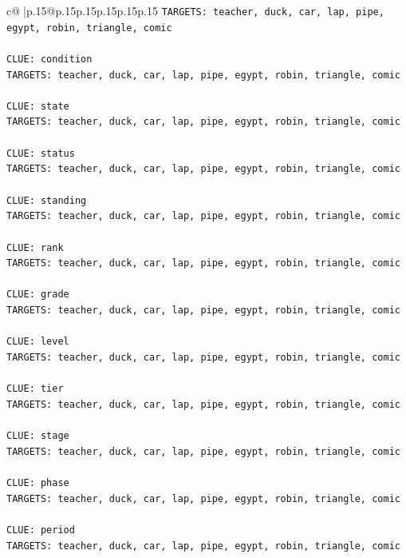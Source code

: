 \documentclass{article}
\begin{document}
{\begin{supertabular}{c@{$\;$}|p{.15\linewidth}@{}p{.15\linewidth}p{.15\linewidth}p{.15\linewidth}p{.15\linewidth}p{.15\linewidth}}
{{{\texttt{TARGETS: teacher, duck, car, lap, pipe, egypt, robin, triangle, comic} \\
\\ 
\texttt{CLUE: condition} \\
\texttt{TARGETS: teacher, duck, car, lap, pipe, egypt, robin, triangle, comic} \\
\\ 
\texttt{CLUE: state} \\
\texttt{TARGETS: teacher, duck, car, lap, pipe, egypt, robin, triangle, comic} \\
\\ 
\texttt{CLUE: status} \\
\texttt{TARGETS: teacher, duck, car, lap, pipe, egypt, robin, triangle, comic} \\
\\ 
\texttt{CLUE: standing} \\
\texttt{TARGETS: teacher, duck, car, lap, pipe, egypt, robin, triangle, comic} \\
\\ 
\texttt{CLUE: rank} \\
\texttt{TARGETS: teacher, duck, car, lap, pipe, egypt, robin, triangle, comic} \\
\\ 
\texttt{CLUE: grade} \\
\texttt{TARGETS: teacher, duck, car, lap, pipe, egypt, robin, triangle, comic} \\
\\ 
\texttt{CLUE: level} \\
\texttt{TARGETS: teacher, duck, car, lap, pipe, egypt, robin, triangle, comic} \\
\\ 
\texttt{CLUE: tier} \\
\texttt{TARGETS: teacher, duck, car, lap, pipe, egypt, robin, triangle, comic} \\
\\ 
\texttt{CLUE: stage} \\
\texttt{TARGETS: teacher, duck, car, lap, pipe, egypt, robin, triangle, comic} \\
\\ 
\texttt{CLUE: phase} \\
\texttt{TARGETS: teacher, duck, car, lap, pipe, egypt, robin, triangle, comic} \\
\\ 
\texttt{CLUE: period} \\
\texttt{TARGETS: teacher, duck, car, lap, pipe, egypt, robin, triangle, comic} \\
}}}
\end{supertabular}}
\end{document}

